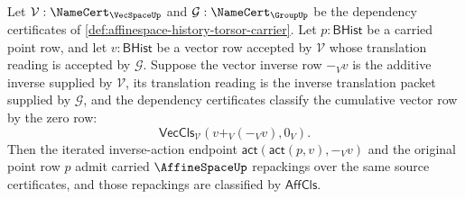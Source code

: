 \begin{theorem}
\label{thm:affinespace-inverse-vector-action-cancels-carried-point}
Let $\mathcal{V}:\NameCert_{\VecSpaceUp}$ and $\mathcal{G}:\NameCert_{\GroupUp}$ be the dependency certificates of \autoref{def:affinespace-history-torsor-carrier}. Let $p:\mathsf{BHist}$ be a carried point row, and let $v:\mathsf{BHist}$ be a vector row accepted by $\mathcal{V}$ whose translation reading is accepted by $\mathcal{G}$. Suppose the vector inverse row $-_V v$ is the additive inverse supplied by $\mathcal{V}$, its translation reading is the inverse translation packet supplied by $\mathcal{G}$, and the dependency certificates classify the cumulative vector row by the zero row:
$$
\mathsf{VecCls}_{\mathcal{V}}(v+_V(-_V v),0_V).
$$
Then the iterated inverse-action endpoint $\mathsf{act}(\mathsf{act}(p,v),-_V v)$ and the original point row $p$ admit carried $\AffineSpaceUp$ repackings over the same source certificates, and those repackings are classified by $\mathsf{AffCls}$.
\end{theorem}
